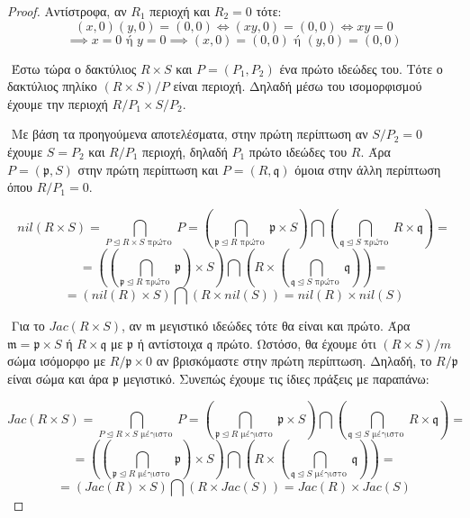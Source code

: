 \documentclass[oneside,a4paper]{article}
\begin{document}
\begin{proof}
	Αντίστροφα, αν $R_1$ περιοχή και $R_2 = 0$ τότε:
	$$(x,0)(y,0) = (0,0) \iff (xy,0) = (0,0) \iff xy = 0$$
	$$ \implies x = 0 \text{ ή } y = 0 \implies (x,0) = (0,0) \text{ ή } (y,0) = (0,0) $$


	$ $\newline
	Έστω τώρα ο δακτύλιος $R \times S$ και $P=(P_1,P_2)$ ένα πρώτο ιδεώδες του. Τότε ο δακτύλιος πηλίκο $(R\times S)/P$ είναι περιοχή. Δηλαδή μέσω του ισομορφισμού έχουμε την περιοχή $R/P_1 \times S/P_2$.
	
	$ $\newline
	Με βάση τα προηγούμενα αποτελέσματα, στην πρώτη περίπτωση αν $S/P_2 = 0$ έχουμε $S=P_2$ και $R/P_1$ περιοχή, δηλαδή $P_1$ πρώτο ιδεώδες του $R$. Άρα $P = (\mathfrak{p}, S)$ στην πρώτη περίπτωση και $P = (R,\mathfrak{q})$ όμοια στην άλλη περίπτωση όπου $R/P_1 = 0$.


	$$nil(R \times S) = \bigcap\limits_{P \unlhd R\times S \text{ πρώτο }} P = \left(\bigcap\limits_{\mathfrak{p} \unlhd R \text{ πρώτο }} \mathfrak{p} \times S \right) \bigcap \left(\bigcap\limits_{\mathfrak{q} \unlhd S \text{ πρώτο }} R \times \mathfrak{q} \right) = $$
	$$ = \left( \left( \bigcap\limits_{\mathfrak{p} \unlhd R \text{ πρώτο } } \mathfrak{p} \right) \times S \right) \bigcap \left(R \times \left( \bigcap\limits_{\mathfrak{q} \unlhd S \text{ πρώτο }} \mathfrak{q} \right)\right) = $$
	$$ = \left(nil(R) \times S\right) \bigcap \left( R \times nil(S) \right) = nil(R) \times nil(S)$$

	$ $\newline
	Για το $Jac(R\times S)$, αν $\mathfrak{m}$ μεγιστικό ιδεώδες τότε θα είναι και πρώτο. Άρα $\mathfrak{m} = \mathfrak{p} \times S$ ή $R \times \mathfrak{q}$ με $\mathfrak{p}$ ή αντίστοιχα $\mathfrak{q}$ πρώτο. Ωστόσο, θα έχουμε ότι $(R\times S)/m$ σώμα ισόμορφο με $R/\mathfrak{p} \times 0$ αν βρισκόμαστε στην πρώτη περίπτωση. Δηλαδή, το $R/\mathfrak{p}$ είναι σώμα και άρα $\mathfrak{p}$ μεγιστικό. Συνεπώς έχουμε τις ίδιες πράξεις με παραπάνω:

	$$Jac(R \times S) = \bigcap\limits_{P \unlhd R\times S \text{ μέγιστο }} P = \left(\bigcap\limits_{\mathfrak{p} \unlhd R \text{ μέγιστο }} \mathfrak{p} \times S \right) \bigcap \left(\bigcap\limits_{\mathfrak{q} \unlhd S \text{ μέγιστο }} R \times \mathfrak{q} \right) = $$
	$$ = \left( \left( \bigcap\limits_{\mathfrak{p} \unlhd R \text{ μέγιστο } } \mathfrak{p} \right) \times S \right) \bigcap \left(R \times \left( \bigcap\limits_{\mathfrak{q} \unlhd S \text{ μέγιστο }} \mathfrak{q} \right)\right) = $$
	$$ = \left(Jac(R) \times S\right) \bigcap \left( R \times Jac(S) \right) = Jac(R) \times Jac(S)$$


\end{proof}
\end{document}
